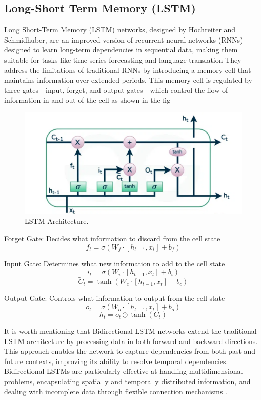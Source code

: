 \subsection{ Long-Short Term Memory (LSTM)}
Long Short-Term Memory (LSTM) networks, designed by Hochreiter and Schmidhuber, are an improved version of recurrent neural networks (RNNs) designed to learn long-term dependencies in sequential data, making them suitable for tasks like time series forecasting and language translation
They address the limitations of traditional RNNs by introducing a memory cell that maintains information over extended periods. This memory cell is regulated by three gates—input, forget, and output gates—which control the flow of information in and out of the cell as shown in the fig \cite{geeksforgeeks_lstm}
\begin{figure}[htbp]
	\centering\includegraphics[width=0.9\linewidth]{Figures/LSTM.png}
	\caption{LSTM Architecture.}
	\label{/LSTM.png}
\end{figure}
Forget Gate: Decides what information to discard from the cell state
\[
f_t = \sigma \left( W_f \cdot [h_{t-1}, x_t] + b_f \right)
\]

Input Gate: Determines what new information to add to the cell state
\[
i_t = \sigma \left( W_i \cdot [h_{t-1}, x_t] + b_i \right)
\]
\[
\tilde{C}_t = \tanh \left( W_c \cdot [h_{t-1}, x_t] + b_c \right)
\]

Output Gate: Controls what information to output from the cell state
\[
o_t = \sigma \left( W_o \cdot [h_{t-1}, x_t] + b_o \right)
\]
\[
h_t = o_t \odot \tanh(C_t)
\]

It is worth mentioning that Bidirectional LSTM networks extend the traditional LSTM architecture by processing data in both forward and backward directions. This approach enables the network to capture dependencies from both past and future contexts, improving its ability to resolve temporal dependencies. Bidirectional LSTMs are particularly effective at handling multidimensional problems, encapsulating spatially and temporally distributed information, and dealing with incomplete data through flexible connection mechanisms \cite{hochreiter1997long}. 
